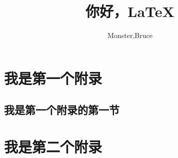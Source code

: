 \documentclass[cs4size,a4paper,fancyhdr,fntef,oneside,openany]{ctexbook}
\title{你好，\LaTeX}
\author{Monster,Bruce}
\begin{document}
\maketitle
\frontmatter
\tableofcontents
\mainmatter

\backmatter
\appendix
\chapter{我是第一个附录}
\section{我是第一个附录的第一节}
\chapter{我是第二个附录}
\end{document}
